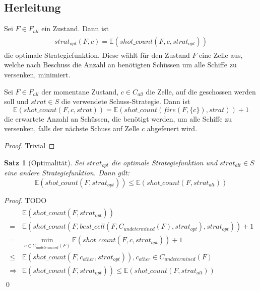 \documentclass[a4paper,12pt]{llncs}
\numberwithin{equation}{section}
\newtheorem{satz}{Satz}
\begin{document}
\subsection{Herleitung}

\begin{definition}
Sei $F\in F_{all}$ ein Zustand.
Dann ist
\begin{align}
\begin{split}
strat_{opt}(F, c)=\mathds{E}(shot\_count(F, c, strat_{opt}))
\end{split}
\end{align}
die optimale Strategiefunktion.
Diese wählt für den Zustand $F$ eine Zelle aus, welche nach Beschuss die Anzahl an benötigten Schüssen um alle Schiffe zu versenken, minimiert.
\end{definition}


\begin{lemma}
Sei $F\in F_{all}$ der momentane Zustand, $c\in C_{all}$ die Zelle, auf die geschossen werden soll und $strat \in S$ die verwendete Schuss-Strategie.
Dann ist
\[
\mathds{E}(shot\_count(F, c, strat))=\mathds{E}(shot\_count(fire(F, \{c\}), strat)) + 1
\]
die erwartete Anzahl an Schüssen, die benötigt werden, um alle Schiffe zu versenken, falls der nächste Schuss auf Zelle $c$ abgefeuert wird.
\end{lemma}

\begin{proof}
Trivial
\end{proof}



\begin{satz}[Optimalität]
Sei $strat_{opt}$ die optimale Strategiefunktion und $strat_{alt} \in S$ eine andere Strategiefunktion.
Dann gilt:
\[
\mathds{E}(shot\_count(F, strat_{opt})) \leq \mathds{E}(shot\_count(F, strat_{alt}))
\]
\end{satz}

\begin{proof}
TODO
\begin{align}
\begin{split}
&\mathds{E}(shot\_count(F, strat_{opt}))\\
=&\mathds{E}(shot\_count(F, best\_cell(F, C_{undetermined}(F), strat_{opt}), strat_{opt})) + 1\\
=&\min_{c \in C_{undetermined}(F)} \mathds{E}(shot\_count(F, c, strat_{opt})) + 1\\
\leq & \mathds{E}(shot\_count(F, c_{other}, strat_{opt})), c_{other} \in C_{undetermined}(F)\\
\Rightarrow &\mathds{E}(shot\_count(F, strat_{opt})) \leq \mathds{E}(shot\_count(F, strat_{alt}))
\end{split}
\end{align}
\qed
\end{proof}
\end{document}
